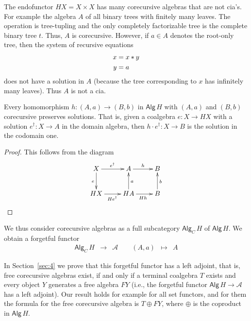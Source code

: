 \documentclass{LMCS}
\theoremstyle{plain}
\theoremstyle{definition}
\numberwithin{equation}{section}
\begin{document}
\begin{exa}
The endofunctor $HX=X\times X$ has many corecursive algebras that are not cia's. For example the algebra $A$ of all binary trees with finitely many leaves. The operation is tree-tupling and the only completely factorizable tree is the complete binary tree $t$. Thus, $A$ is corecursive. However, if $a\in A$ denotes the root-only tree, then the system of recursive equations
\begin{align}
x&=x*y\notag\\
y&=a\notag
\end{align}
does not have a solution in $A$ (because the tree corresponding to $x$ has infinitely many leaves). Thus $A$ is not a cia.
\end{exa}



\begin{lem}\label{homos are solution prese}
Every homomorphism $h:(A,a)\rightarrow (B,b)$ in $\mathsf{Alg}\, H$ with $(A,a)$ and $(B,b)$ corecursive preserves solutions. That is,  given a coalgebra $e:X\rightarrow HX$ with a solution $e^{\dagger}:X\rightarrow A$ in the domain algebra, then $h\cdot e^\dagger:X\rightarrow B$ is the solution in the codomain one.
\end{lem}

\begin{proof}
This follows from the diagram
\[
\xymatrix{
X\ar[r]^{e^\dagger}\ar[d]_{e}&A\ar[r]^h&B\\
HX\ar[r]_{He^\dagger}&HA\ar[u]_{a}\ar[r]_{Hh}&B\ar[u]_b 
}
\vspace*{-22pt}
\]
\end{proof}


\noindent We thus consider corecursive algebras as a full subcategory $\mathsf{Alg}_C\, H$ of $\mathsf{Alg}\, H$. We obtain a forgetful functor
\[\begin{array}{cccccc}
\mathsf{Alg}_C\,H&\rightarrow &\mathcal A\qquad
(A,a)&\mapsto&A
\end{array}\]

In Section~\ref{sec:4} we prove that this forgetful functor has a left adjoint, that is, free corecursive algebras exist, if and only if a terminal coalgebra $T$ exists and every object $Y$ generates a free algebra $FY$ (i.e., the forgetful functor $\mathsf{Alg}\, H\rightarrow \mathcal A$ has a left adjoint). Our result holds for example for all set functors, and for them the formula for the free corecursive algebra is $T\oplus FY$, where $\oplus$ is the coproduct in $\mathsf{Alg}\, H$.
\end{document}

